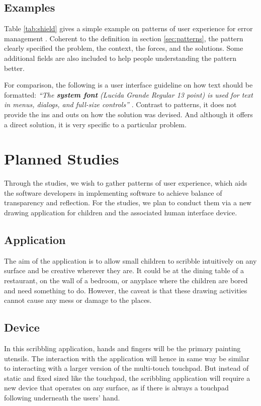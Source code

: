 \documentclass[a4paper,titlepage]{article}
\begin{document}
\subsection{Examples}
Table \ref{tab:shield} gives a simple example on patterns of user
experience for error management \citep{patterns:welie}. Coherent to
the definition in section \ref{sec:patterns}, the pattern clearly
specified the problem, the context, the forces, and the
solutions. Some additional fields are also included to help people
understanding the pattern better.

For comparison, the following is a user interface guideline on how
text should be formatted: \textit{``The \textbf{system font} (Lucida
  Grande Regular 13 point) is used for text in menus, dialogs, and
  full-size controls''} \citep{hig:apple}. Contrast to patterns, it
does not provide the ins and outs on how the solution was devised. And
although it offers a direct solution, it is very specific to a
particular problem.


\section{Planned Studies}
\label{sec:studies}
Through the studies, we wish to gather patterns of user experience,
which aids the software developers in implementing software to achieve
balance of transparency and reflection. For the studies, we plan to
conduct them via a new drawing application for children and the
associated human interface device.

\subsection{Application}
The aim of the application is to allow small children to scribble
intuitively on any surface and be creative wherever they are. It could
be at the dining table of a restaurant, on the wall of a bedroom, or
anyplace where the children are bored and need something to
do. However, the caveat is that these drawing activities cannot cause
any mess or damage to the places.

\subsection{Device}
In this scribbling application, hands and fingers will be the primary
painting utensils. The interaction with the application will hence in
same way be similar to interacting with a larger version of the
multi-touch touchpad. But instead of static and fixed sized like the
touchpad, the scribbling application will require a new device that
operates on any surface, as if there is always a touchpad following
underneath the users' hand.
\end{document}
